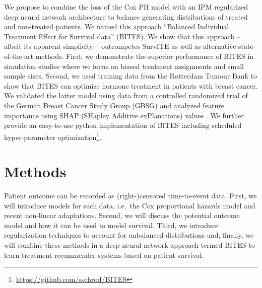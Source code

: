 \documentclass{article}
\begin{document}
	We propose to combine the loss of the Cox PH model with an IPM regularized deep neural network architecture to balance generating distributions of treated and non-treated patients. We named this approach ``Balanced Individual Treatment Effect for Survival data'' (BITES).
	We show that this approach -- albeit its apparent simplicity -- outcompetes SurvITE as well as alternative state-of-the-art methods. First, we demonstrate the superior performance of BITES in simulation studies where we focus on biased treatment assignments and small sample sizes. Second, we used training data from the Rotterdam Tumour Bank \cite{Foekens.2000} to show that BITES can optimize hormone treatment in patients with breast cancer. We validated the latter model using data from a controlled randomized trial of the German Breast Cancer Study Group (GBSG) \cite{Schumacher.1994} and analyzed feature importance using SHAP (SHapley Additive exPlanations) values \cite{Lundberg.2017}. We further provide an easy-to-use python implementation of BITES including scheduled hyper-parameter optimization\footnote{\url{https://github.com/sschrod/BITES}}.
	
	
	\section{Methods}
	Patient outcome can be recorded as (right-)censored time-to-event data. First, we will introduce models for such data, i.e.~the Cox proportional hazards model and recent non-linear adaptations. Second, we will discuss the potential outcome model and how it can be used to model survival. Third, we introduce regularization techniques to account for unbalanced distributions and, finally, we will combine these methods in a deep neural network approach termed BITES to learn treatment recommender systems based on patient survival.
	
\end{document}
